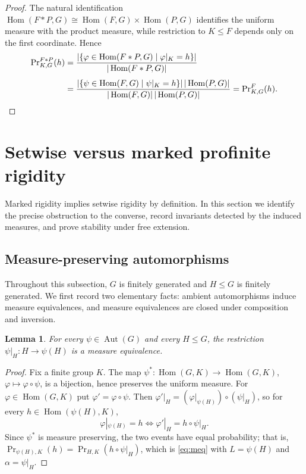 \documentclass[11pt]{amsart}
\theoremstyle{plain}
\newtheorem{lemma}[theorem]{Lemma}
\theoremstyle{definition}
\newcommand{\Hom}{\operatorname{Hom}}
\newcommand{\Aut}{\operatorname{Aut}}
\begin{document}
\begin{proof}
The natural identification
$\Hom(F*P,G)\cong\Hom(F,G)\times\Hom(P,G)$ identifies the uniform measure with
the product measure, while restriction to $K\le F$ depends only on the first
coordinate. Hence
\begin{align*}
  \Pr\nolimits^{F*P}_{K,G}(h)
  &=\frac{|\{\varphi\in\Hom(F*P,G)\mid\varphi|_K=h\}|}{|\Hom(F*P,G)|}\\[4pt]
  &=\frac{|\{\psi\in\Hom(F,G)\mid\psi|_K=h\}|\,|\Hom(P,G)|}
         {|\Hom(F,G)|\,|\Hom(P,G)|}
   =\Pr\nolimits^{F}_{K,G}(h). \qedhere
\end{align*}
\end{proof}


\section{Setwise versus marked profinite rigidity}\label{sec:setwise-vs-marked}


Marked rigidity implies setwise rigidity by definition. In this section we
identify the precise obstruction to the converse, record invariants detected by
the induced measures, and prove stability under free extension.


\subsection{Measure-preserving automorphisms}\label{sec:mp}


Throughout this subsection, $G$ is finitely generated and $H\le G$ is finitely
generated. We first record two elementary facts: ambient
automorphisms induce measure equivalences, and measure equivalences are closed
under composition and inversion.

\begin{lemma}\label{lem:aut}
For every $\psi\in\Aut(G)$ and every $H\le G$, the restriction
$\psi|_H\colon H\to\psi(H)$ is a measure equivalence.
\end{lemma}

\begin{proof}
Fix a finite group $K$.  The map
$\psi^{*}\colon\Hom(G,K)\to\Hom(G,K)$, $\varphi\mapsto\varphi\circ\psi$, is a
bijection, hence preserves the uniform measure.  For $\varphi\in\Hom(G,K)$ put
$\varphi'=\varphi\circ\psi$.  Then
$\varphi'|_{H}=(\varphi|_{\psi(H)})\circ(\psi|_{H})$, so for every
$h\in\Hom(\psi(H),K)$,
\[
  \varphi|_{\psi(H)}=h
  \iff
  \varphi'|_{H}=h\circ\psi|_{H}.
\]
Since $\psi^{*}$ is measure preserving, the two events have equal probability;
that is,
$\Pr_{\psi(H),K}(h)=\Pr_{H,K}(h\circ\psi|_H)$,
which is \eqref{eq:meq} with $L=\psi(H)$ and $\alpha=\psi|_H$.
\end{proof}
\end{document}
